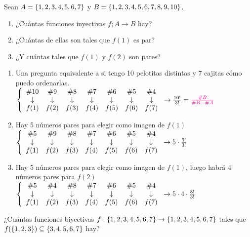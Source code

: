 \documentclass[12pt,a4paper, spanish]{article}
\begin{document}
\ejercicio
Sean $A = \set{1,2,3,4,5,6,7}$ y $B = \set{1,2,3,4,5,6,7,8,9,10}$.
\begin{enumerate}[label=\roman*)]
	\item ¿Cuántas funciones inyectivas $f; A \to B$ hay?
	\item ¿Cuántas de ellas son tales que $f(1)$ es par?
	\item ¿Y cuántas tales que $f(1)$ y $f(2)$ son pares?
\end{enumerate}

\separadorCorto

\begin{enumerate}[label=\roman*)]
	\item Una pregunta equivalente a si tengo 10 pelotitas distintas y 7 cajitas cómo puedo ordenarlas.
	      $\llave{c c c c c c c}{
			      \#10 & \#9 & \#8 & \#7 & \#6 & \#5 & \#4 \\
			      \downarrow &\downarrow & \downarrow &\downarrow &\downarrow &\downarrow &\downarrow\\
			      f(1) & f(2) &f(3) &f(4) &f(5) &f(6) &f(7)
		      }
		      \to\frac{10!}{3!} = \magenta{$\frac{\#B}{\#B - \#A}$
		      }$

	\item Hay 5 números pares para elegir como imagen de $f(1)$\\
	      $\llave{c c c c c c c}{
			      \#5 & \#9 & \#8 & \#7 & \#6 & \#5 & \#4 \\
			      \downarrow &\downarrow & \downarrow &\downarrow &\downarrow &\downarrow &\downarrow\\
			      f(1) & f(2) &f(3) &f(4) &f(5) &f(6) &f(7)
		      }
		      \to 5 \cdot \frac{9!}{3!}$

	\item Hay 5 números pares para elegir como imagen de $f(1)$, luego habrá 4 números pares para $f(2)$\\
	      $\llave{c c c c c c c}{
			      \#5 & \#4 & \#8 & \#7 & \#6 & \#5 & \#4 \\
			      \downarrow &\downarrow & \downarrow &\downarrow &\downarrow &\downarrow &\downarrow\\
			      f(1) & f(2) &f(3) &f(4) &f(5) &f(6) &f(7)
		      }
		      \to 5 \cdot 4 \cdot \frac{8!}{3!}$
\end{enumerate}

\ejercicio
¿Cuántas funciones biyectivas $f: \set{1,2,3,4,5,6,7} \to \set{1,2,3,4,5,6,7}$ tales que $f(\set{1,2,3}) \subseteq \set{3,4,5,6,7}$ hay?
\end{document}
